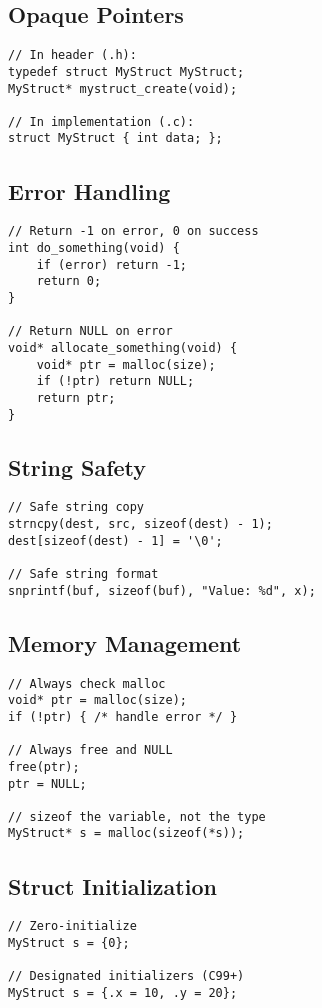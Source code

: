 \documentclass[10pt,openany]{book}
\begin{document}
\subsection*{Opaque Pointers}
\begin{lstlisting}
// In header (.h):
typedef struct MyStruct MyStruct;
MyStruct* mystruct_create(void);

// In implementation (.c):
struct MyStruct { int data; };
\end{lstlisting}

\subsection*{Error Handling}
\begin{lstlisting}
// Return -1 on error, 0 on success
int do_something(void) {
    if (error) return -1;
    return 0;
}

// Return NULL on error
void* allocate_something(void) {
    void* ptr = malloc(size);
    if (!ptr) return NULL;
    return ptr;
}
\end{lstlisting}

\subsection*{String Safety}
\begin{lstlisting}
// Safe string copy
strncpy(dest, src, sizeof(dest) - 1);
dest[sizeof(dest) - 1] = '\0';

// Safe string format
snprintf(buf, sizeof(buf), "Value: %d", x);
\end{lstlisting}

\subsection*{Memory Management}
\begin{lstlisting}
// Always check malloc
void* ptr = malloc(size);
if (!ptr) { /* handle error */ }

// Always free and NULL
free(ptr);
ptr = NULL;

// sizeof the variable, not the type
MyStruct* s = malloc(sizeof(*s));
\end{lstlisting}

\subsection*{Struct Initialization}
\begin{lstlisting}
// Zero-initialize
MyStruct s = {0};

// Designated initializers (C99+)
MyStruct s = {.x = 10, .y = 20};
\end{lstlisting}
\end{document}
